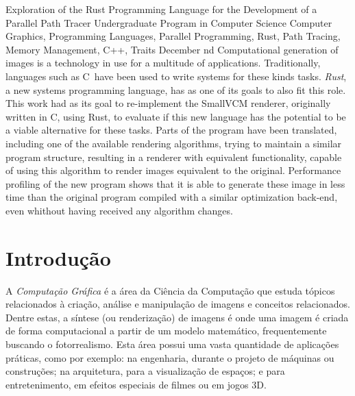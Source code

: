 \documentclass[tg]{mdtufsm}
\def\Cpp{{C\nolinebreak[4]\raisebox{.20ex}{\small\bf++}}}
\begin{document}
\begin{englishabstract}
{Exploration of the Rust Programming Language for the Development of a Parallel Path Tracer}
{Undergraduate Program in Computer Science}
{Computer Graphics, Programming Languages, Parallel Programming, Rust, Path Tracing, Memory Management, C++, Traits}
{December}
{nd}
Computational generation of images is a technology in use for a multitude of applications.
Traditionally, languages such as \Cpp\ have been used to write systems for these kinds tasks.
\emph{Rust}, a new systems programming language, has as one of its goals to also fit this role. This
work had as its goal to re-implement the SmallVCM renderer, originally written in \Cpp, using Rust,
to evaluate if this new language has the potential to be a viable alternative for these tasks. Parts of
the program have been translated, including one of the available rendering algorithms, trying to
maintain a similar program structure, resulting in a renderer with equivalent functionality, capable
of using this algorithm to render images equivalent to the original. Performance profiling of the new
program shows that it is able to generate these image in less time than the original program compiled
with a similar optimization back-end, even whithout having received any algorithm changes.
\end{englishabstract}

\tableofcontents
\listoffigures
\listoftables

\setlength{\baselineskip}{1.5\baselineskip}


\chapter{Introdução}

A \emph{Computação Gráfica} é a área da Ciência da Computação que estuda tópicos relacionados à
criação, análise e manipulação de imagens e conceitos relacionados. Dentre estas, a síntese (ou
renderização) de imagens é onde uma imagem é criada de forma computacional a partir de um modelo
matemático, frequentemente buscando o fotorrealismo. Esta área possui uma vasta quantidade de aplicações
práticas, como por exemplo: na engenharia, durante o projeto de máquinas ou construções; na arquitetura, para
a visualização de espaços; e para entretenimento, em efeitos especiais de filmes ou em jogos 3D.
\end{document}
